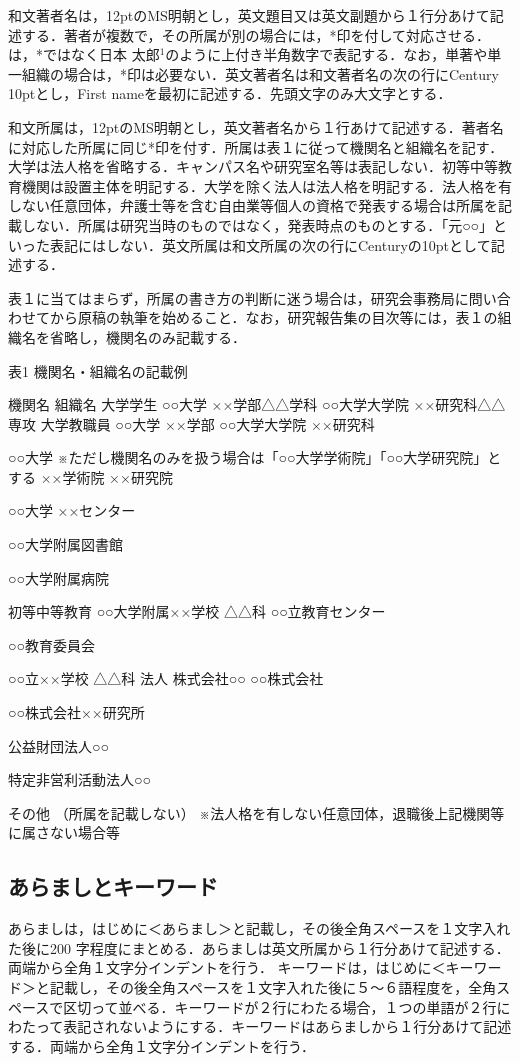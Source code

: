 \documentclass[dvipdfmx]{jset-study-group}
\begin{document}
和文著者名は，12ptのMS明朝とし，英文題目又は英文副題から１行分あけて記述する．著者が複数で，その所属が別の場合には，*印を付して対応させる．は，*ではなく日本 太郎$^1$のように上付き半角数字で表記する．なお，単著や単一組織の場合は，*印は必要ない．英文著者名は和文著者名の次の行にCentury 10ptとし，First nameを最初に記述する．先頭文字のみ大文字とする．

和文所属は，12ptのMS明朝とし，英文著者名から１行あけて記述する．著者名に対応した所属に同じ*印を付す．所属は表１に従って機関名と組織名を記す．大学は法人格を省略する．キャンパス名や研究室名等は表記しない．初等中等教育機関は設置主体を明記する．大学を除く法人は法人格を明記する．法人格を有しない任意団体，弁護士等を含む自由業等個人の資格で発表する場合は所属を記載しない．所属は研究当時のものではなく，発表時点のものとする．「元○○」といった表記にはしない．英文所属は和文所属の次の行にCenturyの10ptとして記述する．

表１に当てはまらず，所属の書き方の判断に迷う場合は，研究会事務局に問い合わせてから原稿の執筆を始めること．なお，研究報告集の目次等には，表１の組織名を省略し，機関名のみ記載する．

表1 機関名・組織名の記載例

機関名
組織名
大学学生
○○大学
××学部△△学科
○○大学大学院
××研究科△△専攻
大学教職員
○○大学
××学部
○○大学大学院
××研究科

○○大学
※ただし機関名のみを扱う場合は「○○大学学術院」「○○大学研究院」とする
××学術院
××研究院

○○大学
××センター

○○大学附属図書館


○○大学附属病院

初等中等教育
○○大学附属××学校
△△科
○○立教育センター


○○教育委員会

○○立××学校
△△科
法人
株式会社○○
○○株式会社

○○株式会社××研究所


公益財団法人○○

特定非営利活動法人○○

その他
（所属を記載しない）
※法人格を有しない任意団体，退職後上記機関等に属さない場合等


\subsection{あらましとキーワード}

あらましは，はじめに＜あらまし＞と記載し，その後全角スペースを１文字入れた後に200 字程度にまとめる．あらましは英文所属から１行分あけて記述する．両端から全角１文字分インデントを行う．
キーワードは，はじめに＜キーワード＞と記載し，その後全角スペースを１文字入れた後に５～６語程度を，全角スペースで区切って並べる．キーワードが２行にわたる場合，１つの単語が２行にわたって表記されないようにする．キーワードはあらましから１行分あけて記述する．両端から全角１文字分インデントを行う．
\end{document}
